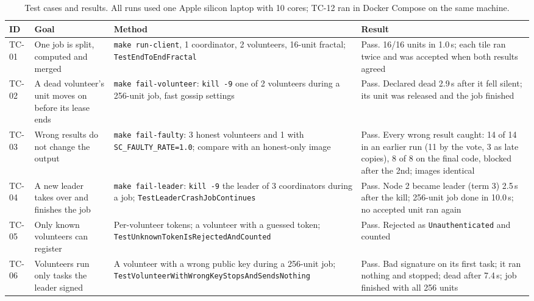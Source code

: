 \begin{table}[t]
\centering
\caption{Test cases and results. All runs used one Apple silicon laptop with 10 cores; TC-12 ran in Docker Compose on the same machine.}
\label{tab:tests}
\footnotesize
\makeatletter
\let\scParboxRestore\@arrayparboxrestore
\def\@arrayparboxrestore{\scParboxRestore\raggedright\let\\\tabularnewline}
\makeatother
\begin{tabular}{@{}lp{}p{}p{}@{}}
\toprule
ID & Goal & Method & Result \\
\midrule
TC-01 & One job is split, computed and merged & \texttt{make run-client}, 1 coordinator, 2 volunteers, 16-unit fractal; \texttt{TestEndToEndFractal} & Pass. 16/16 units in 1.0\,s; each tile ran twice and was accepted when both results agreed \\
TC-02 & A dead volunteer's unit moves on before its lease ends & \texttt{make fail-volunteer}: \texttt{kill -9} one of 2 volunteers during a 256-unit job, fast gossip settings & Pass. Declared dead 2.9\,s after it fell silent; its unit was released and the job finished \\
TC-03 & Wrong results do not change the output & \texttt{make fail-faulty}: 3 honest volunteers and 1 with \texttt{SC\_FAULTY\_RATE=1.0}; compare with an honest-only image & Pass. Every wrong result caught: 14 of 14 in an earlier run (11 by the vote, 3 as late copies), 8 of 8 on the final code, blocked after the 2nd; images identical \\
TC-04 & A new leader takes over and finishes the job & \texttt{make fail-leader}: \texttt{kill -9} the leader of 3 coordinators during a job; \texttt{TestLeaderCrashJobContinues} & Pass. Node 2 became leader (term 3) 2.5\,s after the kill; 256-unit job done in 10.0\,s; no accepted unit ran again \\
TC-05 & Only known volunteers can register & Per-volunteer tokens; a volunteer with a guessed token; \texttt{TestUnknownTokenIsRejected\allowbreak AndCounted} & Pass. Rejected as \texttt{Unauthenticated} and counted \\
TC-06 & Volunteers run only tasks the leader signed & A volunteer with a wrong public key during a 256-unit job; \texttt{TestVolunteerWithWrongKey\allowbreak StopsAndSendsNothing} & Pass. Bad signature on its first task; it ran nothing and stopped; dead after 7.4\,s; job finished with all 256 units \\

\end{tabular}
\end{table}
